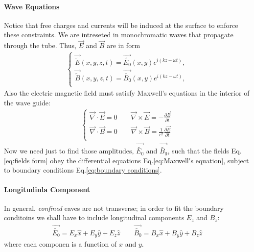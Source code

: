 \documentclass{article}
\begin{document}
    \paragraph{Wave Equations} %
    \label{par:Wave Equations}
        Notice that free charges and currents will be induced at the surface
        to enforce these constraints. We are intreseted in monochromatic waves
        that propagate through the tube. Thus, $\vec{E}$ and $\vec{B}$ are in form
        \begin{align}
            \label{eq:fields form}
            \begin{cases}
                \vec{\tilde{E}}(x, y, z, t) = \vec{\tilde{E_0}}(x, y) e^{i(kz-\omega t)}, \\
                \vec{\tilde{B}}(x, y, z, t) = \vec{\tilde{B_0}}(x, y) e^{i(kz-\omega t)}, \\
            \end{cases}
        \end{align}
        Also the electric magnetic field must satisfy Maxwell's equations in the
        interior of the wave guide:
        \begin{align}
            \label{eq:Maxwell's equation}
            \begin{cases}
                \vec{\nabla} \cdot  \vec{E} = 0 \qquad \vec{\nabla} \times \vec{E} = - \frac{\partial \vec{B}}{\partial t} \\
                \vec{\nabla} \cdot  \vec{B} = 0 \qquad \vec{\nabla} \times \vec{B} = \frac{1}{c^2} \frac{\partial \vec{E}}{\partial t} \\
            \end{cases}
        \end{align}
        Now we need just to find those amplitudes, $\vec{\tilde{E_0}}$ and $\vec{\tilde{B_0}}$,
        such that the fields Eq.\eqref{eq:fields form} obey the differential equations 
        Eq.\eqref{eq:Maxwell's equation}, subject to boundary conditions Eq.\eqref{eq:boundary conditions}.

    \paragraph{Longitudinla Component} %
    \label{par:Longitudinla Component}
        In general, \textit{confined} eaves are not transverse; in order to fit the boundary
        conditoins we shall have to include longitudinal components $E_z$ and $B_z$:
        \begin{align}
            \label{eq:Amplitudes in componen form}
            \vec{\tilde{E_0}} = E_x \hat{x} + E_y \hat{y} + E_z \hat{z} \qquad 
            \vec{\tilde{B_0}} = B_x \hat{x} + B_y \hat{y} + B_z \hat{z} 
        \end{align}
        where each componen is a function of $x$ and $y$.
\end{document}
